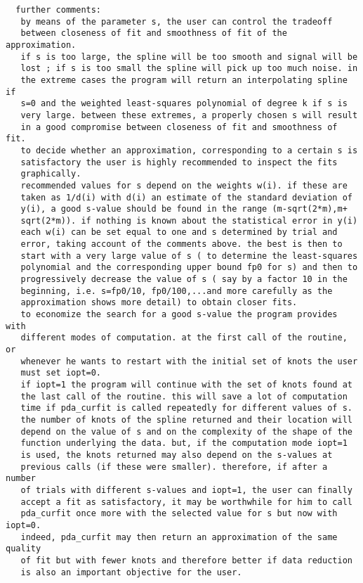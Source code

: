 \begin{verbatim}
  further comments:
   by means of the parameter s, the user can control the tradeoff
   between closeness of fit and smoothness of fit of the approximation.
   if s is too large, the spline will be too smooth and signal will be
   lost ; if s is too small the spline will pick up too much noise. in
   the extreme cases the program will return an interpolating spline if
   s=0 and the weighted least-squares polynomial of degree k if s is
   very large. between these extremes, a properly chosen s will result
   in a good compromise between closeness of fit and smoothness of fit.
   to decide whether an approximation, corresponding to a certain s is
   satisfactory the user is highly recommended to inspect the fits
   graphically.
   recommended values for s depend on the weights w(i). if these are
   taken as 1/d(i) with d(i) an estimate of the standard deviation of
   y(i), a good s-value should be found in the range (m-sqrt(2*m),m+
   sqrt(2*m)). if nothing is known about the statistical error in y(i)
   each w(i) can be set equal to one and s determined by trial and
   error, taking account of the comments above. the best is then to
   start with a very large value of s ( to determine the least-squares
   polynomial and the corresponding upper bound fp0 for s) and then to
   progressively decrease the value of s ( say by a factor 10 in the
   beginning, i.e. s=fp0/10, fp0/100,...and more carefully as the
   approximation shows more detail) to obtain closer fits.
   to economize the search for a good s-value the program provides with
   different modes of computation. at the first call of the routine, or
   whenever he wants to restart with the initial set of knots the user
   must set iopt=0.
   if iopt=1 the program will continue with the set of knots found at
   the last call of the routine. this will save a lot of computation
   time if pda_curfit is called repeatedly for different values of s.
   the number of knots of the spline returned and their location will
   depend on the value of s and on the complexity of the shape of the
   function underlying the data. but, if the computation mode iopt=1
   is used, the knots returned may also depend on the s-values at
   previous calls (if these were smaller). therefore, if after a number
   of trials with different s-values and iopt=1, the user can finally
   accept a fit as satisfactory, it may be worthwhile for him to call
   pda_curfit once more with the selected value for s but now with iopt=0.
   indeed, pda_curfit may then return an approximation of the same quality
   of fit but with fewer knots and therefore better if data reduction
   is also an important objective for the user.


\end{verbatim}
